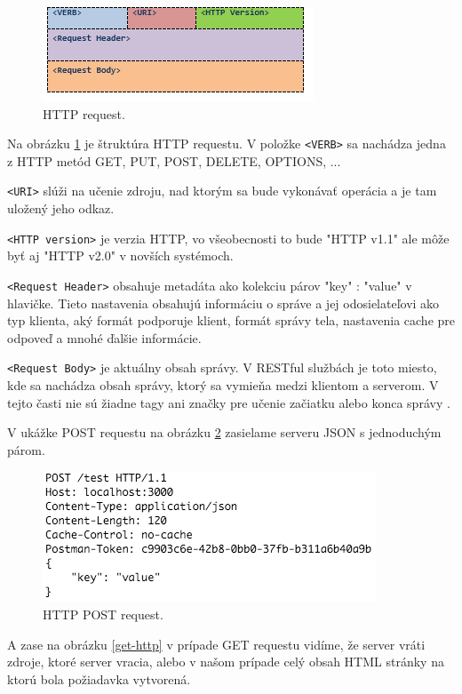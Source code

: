 \begin{figure}[H]
  \centering
  \includegraphics[scale=0.7]{img/rest/rest-http.png}
  \caption{HTTP request.}
  \label{rest-http}
\end{figure}

Na obrázku \ref{rest-http} je štruktúra HTTP requestu. V položke \verb|<VERB>| sa nachádza jedna z HTTP metód GET, PUT, POST, DELETE, OPTIONS, ...

\verb|<URI>| slúži na učenie zdroju, nad ktorým sa bude vykonávať operácia a je tam uložený jeho odkaz.

\verb|<HTTP version>| je verzia HTTP, vo všeobecnosti to bude "HTTP v1.1" ale môže byť aj "HTTP v2.0" v novších systémoch.

\verb|<Request Header>| obsahuje metadáta ako kolekciu párov "key" : "value" v hlavičke. Tieto nastavenia obsahujú informáciu o správe a jej odosielateľovi ako typ klienta, aký formát podporuje klient, formát správy tela, nastavenia cache pre odpoveď a mnohé ďalšie informácie.

\verb|<Request Body>| je aktuálny obsah správy. V RESTful službách je toto miesto, kde sa nachádza obsah správy, ktorý sa vymieňa medzi klientom a serverom. V tejto časti nie sú žiadne tagy ani značky pre učenie začiatku alebo konca správy \cite{rest-vaqqas}.

V ukážke POST requestu na obrázku \ref{post-http} zasielame serveru JSON s jednoduchým párom.

\begin{figure}[H]
  \centering
  \includegraphics[scale=0.7]{img/rest/post-request.png}
  \caption{HTTP POST request.}
  \label{post-http}
\end{figure}

A zase na obrázku \ref{get-http} v prípade GET requestu vidíme, že server vráti zdroje, ktoré server vracia, alebo v našom prípade celý obsah HTML stránky na ktorú bola požiadavka vytvorená.

